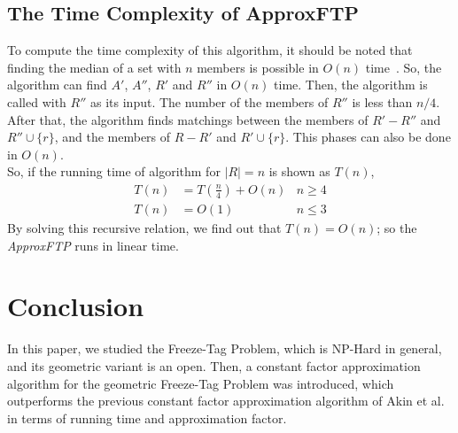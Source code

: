 \documentclass{cccg12}
\begin{document}
\subsection{The Time Complexity of ApproxFTP}
To compute the time complexity of this algorithm, it should be noted that finding the median of a set with $n$ members is possible in $O(n)$ time~\cite{CLRS}. So, the algorithm can find $A'$, $A''$, $R'$ and $R''$ in $O(n)$ time. Then, the algorithm is called with $R''$ as its input. The number of the members of $R''$ is less than $n/4$. After that, the algorithm finds matchings between the members of ${ R'-R'' }$ and ${ R''\cup\{r\} }$, and the members of ${ R-R' }$ and ${ R'\cup\{r\} }$. This phases can also be done in $O(n)$.\\
So, if the running time of algorithm for ${ |R|=n }$ is shown as $T(n)$,
{\small\begin{align}
T(n)&=T(\frac{n}{4})+O(n) &n\geq 4 \nonumber\\
T(n)&=O(1) &n\leq 3 \nonumber
\end{align}}
By solving this recursive relation, we find out that ${ T(n)=O(n) }$; so the \textit{ApproxFTP}  runs in linear time.


\section{Conclusion}
In this paper, we studied the Freeze-Tag Problem, which is NP-Hard in general, and its geometric variant is an open. Then, a constant factor approximation algorithm for the geometric Freeze-Tag Problem was introduced, which outperforms the previous constant factor approximation algorithm of Akin et al.~\cite{Arkin2006} in terms of running time and approximation factor.



\small


\end{document}
